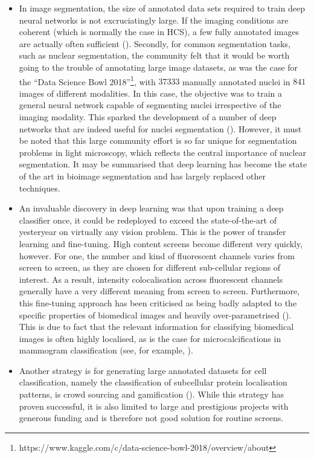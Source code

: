 \begin{itemize}
	\item In image segmentation, the size of annotated data sets required to train deep neural networks is not excruciatingly large. If the imaging conditions are coherent (which is normally the case in HCS), a few fully annotated images are actually often sufficient (\cite{ronneberger2015u}). Secondly, for common segmentation tasks, such as nuclear segmentation, the community felt that it would be worth going to the trouble of annotating large image datasets, as was the case for the ``Data Science Bowl 2018''\footnote{https://www.kaggle.com/c/data-science-bowl-2018/overview/about}, with $37333$ manually annotated nuclei in $841$ images of different modalities. In this case, the objective was to train a general neural network capable of segmenting nuclei irrespective of the imaging modality. This sparked the development of a number of deep networks that are indeed useful for nuclei segmentation (\cite{hollandi2019deep}). However, it must be noted that this large community effort is so far unique for segmentation problems in light microscopy, which reflects the central importance of nuclear segmentation. It may be summarised that deep learning has become the state of the art in bioimage segmentation and has largely replaced other techniques.
	\item An invaluable discovery in deep learning was that upon training a deep classifier once, it could be redeployed to exceed the state-of-the-art of yesteryear on virtually any vision problem. This is the power of transfer learning and fine-tuning. High content screens become different very quickly, however. For one, the number and kind of fluorescent channels varies from screen to screen, as they are chosen for different sub-cellular regions of interest. As a result, intensity colocalisation across fluorescent channels generally have a very different meaning from screen to screen. Furthermore, this fine-tuning approach has been criticised as being badly adapted to the specific properties of biomedical images and heavily over-parametrised (\cite{raghu2019transfusion}). This is due to fact that the relevant information for classifying biomedical images is often highly localised, as is the case for microcalcifications in mammogram classification (see, for example, \cite{wang2018context}).
	\item Another strategy is for generating large annotated datasets for cell classification, namely the classification of subcellular protein localisation patterns, is crowd sourcing and gamification (\cite{sullivan2018deep}). While this strategy has proven successful, it is also limited to large and prestigious projects with generous funding and is therefore not good solution for routine screens. 

\end{itemize}
